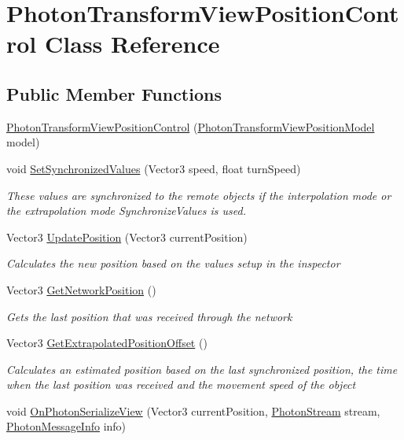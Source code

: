 \hypertarget{class_photon_transform_view_position_control}{}\section{Photon\+Transform\+View\+Position\+Control Class Reference}
\label{class_photon_transform_view_position_control}
\subsection*{Public Member Functions}
\begin{DoxyCompactItemize}
\item 
\hyperlink{class_photon_transform_view_position_control_a3f4cd754b21276bef76609b608e9e774}{Photon\+Transform\+View\+Position\+Control} (\hyperlink{class_photon_transform_view_position_model}{Photon\+Transform\+View\+Position\+Model} model)
\item 
void \hyperlink{class_photon_transform_view_position_control_af8893b17871604614de5d5f80721d0e9}{Set\+Synchronized\+Values} (Vector3 speed, float turn\+Speed)
\begin{DoxyCompactList}\small\item\em These values are synchronized to the remote objects if the interpolation mode or the extrapolation mode Synchronize\+Values is used. \end{DoxyCompactList}\item 
Vector3 \hyperlink{class_photon_transform_view_position_control_aea906d59f0637f9a1ee8a8c6504ad217}{Update\+Position} (Vector3 current\+Position)
\begin{DoxyCompactList}\small\item\em Calculates the new position based on the values setup in the inspector \end{DoxyCompactList}\item 
Vector3 \hyperlink{class_photon_transform_view_position_control_a7c378517491ed0878fa78f8834fa5c0b}{Get\+Network\+Position} ()
\begin{DoxyCompactList}\small\item\em Gets the last position that was received through the network \end{DoxyCompactList}\item 
Vector3 \hyperlink{class_photon_transform_view_position_control_a995fea08fe2aa2ad1c004513c5ba7d65}{Get\+Extrapolated\+Position\+Offset} ()
\begin{DoxyCompactList}\small\item\em Calculates an estimated position based on the last synchronized position, the time when the last position was received and the movement speed of the object \end{DoxyCompactList}\item 
void \hyperlink{class_photon_transform_view_position_control_ac7cc0066925dc4ccf46f2a1ae8a7216f}{On\+Photon\+Serialize\+View} (Vector3 current\+Position, \hyperlink{class_photon_stream}{Photon\+Stream} stream, \hyperlink{class_photon_message_info}{Photon\+Message\+Info} info)
\end{DoxyCompactItemize}


